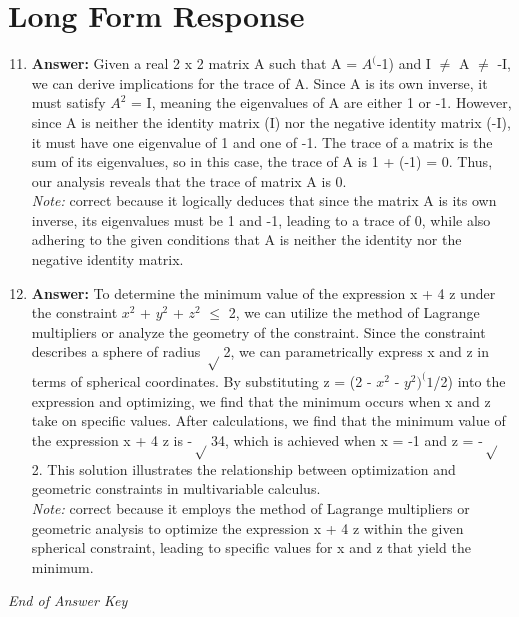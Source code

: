 \documentclass[12pt]{article}
\begin{document}
\section*{Long Form Response}
\begin{enumerate}[label=\arabic*.]
\setcounter{enumi}{10}
\item \textbf{Answer:} Given a real 2 x 2 matrix A such that A = $A^($-1) and I \ensuremath{\neq} A \ensuremath{\neq} -I, we can derive implications for the trace of A. Since A is its own inverse, it must satisfy $A^2$ = I, meaning the eigenvalues of A are either 1 or -1. However, since A is neither the identity matrix (I) nor the negative identity matrix (-I), it must have one eigenvalue of 1 and one of -1. The trace of a matrix is the sum of its eigenvalues, so in this case, the trace of A is 1 + (-1) = 0. Thus, our analysis reveals that the trace of matrix A is 0.
\\ \textit{Note:} correct because it logically deduces that since the matrix A is its own inverse, its eigenvalues must be 1 and -1, leading to a trace of 0, while also adhering to the given conditions that A is neither the identity nor the negative identity matrix.
\item \textbf{Answer:} To determine the minimum value of the expression x + 4 z under the constraint $x^2$ + $y^2$ + $z^2$ \ensuremath{\leq} 2, we can utilize the method of Lagrange multipliers or analyze the geometry of the constraint. Since the constraint describes a sphere of radius \ensuremath{\sqrt} 2, we can parametrically express x and z in terms of spherical coordinates. By substituting z = (2 - $x^2$ - $y^2$$)^(1$/2) into the expression and optimizing, we find that the minimum occurs when x and z take on specific values. After calculations, we find that the minimum value of the expression x + 4 z is -\ensuremath{\sqrt} 34, which is achieved when x = -1 and z = -\ensuremath{\sqrt} 2. This solution illustrates the relationship between optimization and geometric constraints in multivariable calculus.
\\ \textit{Note:} correct because it employs the method of Lagrange multipliers or geometric analysis to optimize the expression x + 4 z within the given spherical constraint, leading to specific values for x and z that yield the minimum.
\end{enumerate}

\vfill
\noindent\textit{End of Answer Key}
\end{document}
